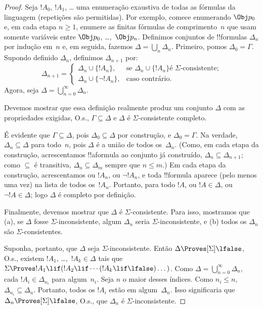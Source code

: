 \documentclass[../../../include/open-logic-section]{subfiles}
\begin{document}
\begin{proof}
Seja $!A_0$, $!A_1$, \dots{} uma enumeração exaustiva de todas as
fórmulas da linguagem (repetições são permitidas). Por exemplo,
comece enumerando $\Obj p_0$ e, em cada etapa $n \ge 1$, enumere as
finitas fórmulas de comprimento~$n$ que usam somente variáveis entre
$\Obj p_0$, \dots,~$\Obj p_n$. Definimos conjuntos de !!{formula}s
$\Delta_n$ por indução em~$n$ e, em seguida, fazemos
$\Delta = \bigcup_n \Delta_n$. Primeiro, pomos $\Delta_0 = \Gamma$.
Supondo definido $\Delta_n$, definimos $\Delta_{n+1}$ por:
\[
\Delta_{n+1} =
\begin{cases}
  \Delta_n \cup \{!A_n\}, & \text{se $\Delta_n \cup \{ !A_n\}$
    é $\Sigma$-consistente;} \\
  \Delta_n \cup \{ \lnot !A_n\}, & \text{caso contrário.}
\end{cases}
\]
Agora, seja $\Delta = \bigcup_{n=0}^\infty \Delta_n$.

Devemos mostrar que essa definição realmente produz um conjunto
$\Delta$ com as propriedades exigidas, O.s.\@,
$\Gamma \subseteq \Delta$ e $\Delta$ é $\Sigma$-consistente completo.

É evidente que $\Gamma \subseteq \Delta$, pois $\Delta_0 \subseteq
\Delta$ por construção, e $\Delta_0 = \Gamma$. Na verdade, $\Delta_n
\subseteq \Delta$ para todo~$n$, pois $\Delta$ é a união de
todos os~$\Delta_n$. (Como, em cada etapa da construção, acrescentamos
!!a{formula} ao conjunto já construído, $\Delta_n \subseteq
\Delta_{n+1}$; como $\subseteq$ é transitiva, $\Delta_n \subseteq
\Delta_{m}$ sempre que $n \le m$.) Em cada etapa da construção,
acrescentamos ou $!A_n$, ou $\lnot !A_n$, e toda !!{formula} aparece
(pelo menos uma vez) na lista de todos os~$!A_n$. Portanto, para todo
$!A$, ou $!A \in \Delta$, ou $\lnot !A \in \Delta$; logo $\Delta$ é
completo por definição.

Finalmente, devemos mostrar que $\Delta$ é $\Sigma$-consistente. Para
isso, mostramos que (a), se $\Delta$ fosse $\Sigma$-inconsistente,
algum $\Delta_n$ seria $\Sigma$-inconsistente, e (b) todos os $\Delta_n$
são $\Sigma$-consistentes.

Suponha, portanto, que $\Delta$ seja $\Sigma$-inconsistente. Então
$\Delta \Proves[\Sigma] \lfalse$, O.s.\@, existem $!A_1$,
\dots,~$!A_k \in \Delta$ tais que $\Sigma \Proves !A_1 \lif (!A_2
\lif \cdots (!A_k \lif \lfalse)\dots)$. Como
$\Delta = \bigcup_{n=0}^\infty \Delta_n$, cada
$!A_i \in \Delta_{n_i}$ para algum~$n_i$. Seja $n$ o maior desses
índices. Como $n_i \le n$, $\Delta_{n_i} \subseteq \Delta_n$.
Portanto, todos os $!A_i$ estão em algum~$\Delta_n$. Isso significaria
que $\Delta_n \Proves[\Sigma] \lfalse$, O.s.\@, que $\Delta_n$ é
$\Sigma$-inconsistente.


\end{proof}
\end{document}
